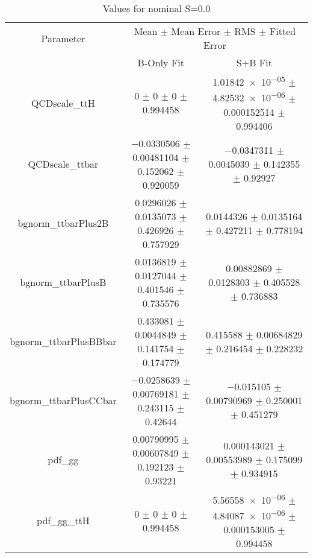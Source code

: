 \begin{table}
\centering
\caption{Values for nominal S=0.0}
\begin{tabular}{ccc}
\toprule
Parameter & \multicolumn{2}{c}{Mean $\pm$ Mean Error $\pm$ RMS $\pm$ Fitted Error}\\
 & B-Only Fit & S+B Fit\\
\midrule
QCDscale\_ttH & \num{0} $\pm$ \num{0} $\pm$ \num{0} $\pm$ \num{0.994458} & \num{1.01842e-05} $\pm$ \num{4.82532e-06} $\pm$ \num{0.000152514} $\pm$ \num{0.994406}\\
QCDscale\_ttbar & \num{-0.0330506} $\pm$ \num{0.00481104} $\pm$ \num{0.152062} $\pm$ \num{0.920059} & \num{-0.0347311} $\pm$ \num{0.0045039} $\pm$ \num{0.142355} $\pm$ \num{0.92927}\\
bgnorm\_ttbarPlus2B & \num{0.0296026} $\pm$ \num{0.0135073} $\pm$ \num{0.426926} $\pm$ \num{0.757929} & \num{0.0144326} $\pm$ \num{0.0135164} $\pm$ \num{0.427211} $\pm$ \num{0.778194}\\
bgnorm\_ttbarPlusB & \num{0.0136819} $\pm$ \num{0.0127044} $\pm$ \num{0.401546} $\pm$ \num{0.735576} & \num{0.00882869} $\pm$ \num{0.0128303} $\pm$ \num{0.405528} $\pm$ \num{0.736883}\\
bgnorm\_ttbarPlusBBbar & \num{0.433081} $\pm$ \num{0.0044849} $\pm$ \num{0.141754} $\pm$ \num{0.174779} & \num{0.415588} $\pm$ \num{0.00684829} $\pm$ \num{0.216454} $\pm$ \num{0.228232}\\
bgnorm\_ttbarPlusCCbar & \num{-0.0258639} $\pm$ \num{0.00769181} $\pm$ \num{0.243115} $\pm$ \num{0.42644} & \num{-0.015105} $\pm$ \num{0.00790969} $\pm$ \num{0.250001} $\pm$ \num{0.451279}\\
pdf\_gg & \num{0.00790995} $\pm$ \num{0.00607849} $\pm$ \num{0.192123} $\pm$ \num{0.93221} & \num{0.000143021} $\pm$ \num{0.00553989} $\pm$ \num{0.175099} $\pm$ \num{0.934915}\\
pdf\_gg\_ttH & \num{0} $\pm$ \num{0} $\pm$ \num{0} $\pm$ \num{0.994458} & \num{5.56558e-06} $\pm$ \num{4.84087e-06} $\pm$ \num{0.000153005} $\pm$ \num{0.994458}\\
\bottomrule
\end{tabular}
\end{table}